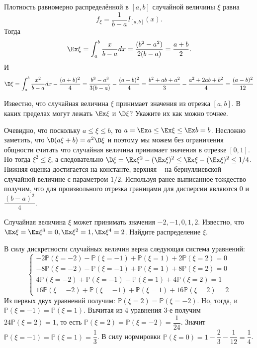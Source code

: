 \begin{solution}
    Плотность равномерно распределённой в $[a, b]$ случайной величины $\xi$ равна \[f_\xi = \dfrac{1}{b - a}I_{[a, b]}(x).\]
    Тогда
    \[
        \Ex \xi = \int_a^b \dfrac{x}{b - a}dx = \dfrac{(b^2 - a^2)}{2(b - a)} = \dfrac{a + b}{2}.
    \]
    И
    \[
        \D \xi = \int_a^b \dfrac{x^2}{b - a}dx - \dfrac{(a + b)^2}{4} = \dfrac{b^3 - a^3}{3(b - a)} - \dfrac{(a + b)^2}{4} = \dfrac{b^2 + ab + a^2}{3} - \dfrac{a^2 + 2ab + b^2}{4} = \dfrac{(a - b)^2}{12}
    \]
\end{solution}
\begin{problem}
    Известно, что случайная величина $\xi$ принимает значения из отрезка $[a, b]$. В каких пределах могут лежать $\Ex \xi$ и $\D \xi$? Укажите их как можно точнее.
\end{problem}
\begin{solution}
    Очевидно, что поскольку $a \leq \xi \leq b$, то $a = \Ex a \leq \Ex \xi \leq \Ex b = b$.
    Несложно заметить, что $\D (a\xi + b) = a^2\D\xi$ и поэтому мы можем без ограничения общности считать что случайная величина принимает значения в отрезке $[0, 1]$.
    Но тогда $\xi^2 \leq \xi$, а следовательно $\D \xi = \Ex \xi^2 - (\Ex \xi)^2 \leq \Ex \xi - (\Ex \xi)^2 \leq 1/4$.
    Нижняя оценка достигается на константе, верхняя -- на бернуллиевской случайной величине с параметром $1/2$.
    Используя ранее выписанное тождество получим, что для произвольного отрезка границами для дисперсии являются $0$ и $\dfrac{(b - a)^2}{4}$.
\end{solution}
\begin{problem}
    Случайная величина $\xi$ может принимать значения $-2, -1, 0, 1, 2$. Известно, что $\Ex \xi = \Ex \xi^3 = 0, \Ex \xi^2 = 1, \Ex \xi^4 = 2$.
    Найдите распределение $\xi$.
\end{problem}
\begin{solution}
    В силу дискретности случайных величин верна следующая система уравнений:
    \begin{equation*}
        \begin{cases}
            -2\mathbb{P}(\xi = -2) - \mathbb{P}(\xi = - 1) + \mathbb{P}(\xi = 1) + 2\mathbb{P}(\xi = 2) = 0 \\
            -8\mathbb{P}(\xi = -2) - \mathbb{P}(\xi = -1) + \mathbb{P}(\xi = 1) + 8\mathbb{P}(\xi = 2) = 0 \\
            4\mathbb{P}(\xi = -2) + \mathbb{P}(\xi = -1) + \mathbb{P}(\xi = 1) + 4\mathbb{P}(\xi = 2) = 1 \\
            16\mathbb{P}(\xi = -2)   + \mathbb{P}(\xi = -1) + \mathbb{P}(\xi = 1) + 16\mathbb{P}(\xi = 2) = 2
        \end{cases}
    \end{equation*}
    Из первых двух уравнений получим: $\mathbb{P}(\xi = 2) = \mathbb{P}(\xi = -2)$. Но, тогда, и $\mathbb{P}(\xi = -1) = \mathbb{P}(\xi = 1)$. Вычитая из 4 уравнения 3-е получим $24\mathbb{P}(\xi = 2) = 1$, то есть $\mathbb{P}(\xi = 2) = \mathbb{P}(\xi = -2) = \dfrac{1}{24}$. Значит $\mathbb{P}(\xi = -1) = \mathbb{P}(\xi = 1) = \dfrac{1}{3}$. В силу нормировки $\mathbb{P}(\xi = 0) = 1 - \dfrac{2}{3} - \dfrac{1}{12} = \dfrac{1}{4}$.
\end{solution}
